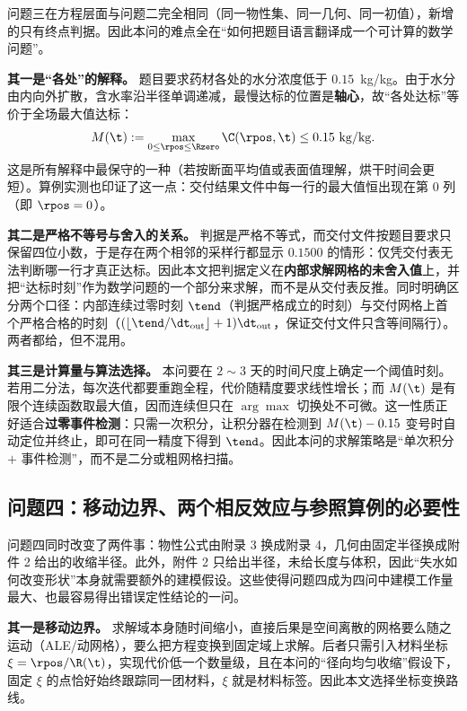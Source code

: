 问题三在方程层面与问题二完全相同（同一物性集、同一几何、同一初值），新增的只有终点判据。因此本问的难点全在``如何把题目语言翻译成一个可计算的数学问题''。

\textbf{其一是``各处''的解释。} 题目要求药材各处的水分浓度低于 $0.15$~kg/kg。由于水分由内向外扩散，含水率沿半径单调递减，最慢达标的位置是\textbf{轴心}，故``各处达标''等价于全场最大值达标：
\begin{equation}
M(\t):=\max_{0\le\rpos\le\Rzero}\C(\rpos,\t)\le 0.15~\mathrm{kg/kg}.
\label{eq:maxcrit}
\end{equation}
这是所有解释中最保守的一种（若按断面平均值或表面值理解，烘干时间会更短）。算例实测也印证了这一点：交付结果文件中每一行的最大值恒出现在第 0 列（即 $\rpos=0$）。

\textbf{其二是严格不等号与舍入的关系。} 判据是严格不等式，而交付文件按题目要求只保留四位小数，于是存在两个相邻的采样行都显示 $0.1500$ 的情形：仅凭交付表无法判断哪一行才真正达标。因此本文把判据定义在\textbf{内部求解网格的未舍入值}上，并把``达标时刻''作为数学问题的一个部分来求解，而不是从交付表反推。同时明确区分两个口径：内部连续过零时刻 $\tend$（判据严格成立的时刻）与交付网格上首个严格合格的时刻（$(\lfloor\tend/\dt_{\mathrm{out}}\rfloor+1)\dt_{\mathrm{out}}$，保证交付文件只含等间隔行）。两者都给，但不混用。

\textbf{其三是计算量与算法选择。} 本问要在 $2\sim3$ 天的时间尺度上确定一个阈值时刻。若用二分法，每次迭代都要重跑全程，代价随精度要求线性增长；而 $M(\t)$ 是有限个连续函数取最大值，因而连续但只在 $\arg\max$ 切换处不可微。这一性质正好适合\textbf{过零事件检测}：只需一次积分，让积分器在检测到 $M(\t)-0.15$ 变号时自动定位并终止，即可在同一精度下得到 $\tend$。因此本问的求解策略是``单次积分 $+$ 事件检测''，而不是二分或粗网格扫描。

\subsection{问题四：移动边界、两个相反效应与参照算例的必要性}

问题四同时改变了两件事：物性公式由附录 3 换成附录 4，几何由固定半径换成附件 2 给出的收缩半径。此外，附件 2 只给出半径，未给长度与体积，因此``失水如何改变形状''本身就需要额外的建模假设。这些使得问题四成为四问中建模工作量最大、也最容易得出错误定性结论的一问。

\textbf{其一是移动边界。} 求解域本身随时间缩小，直接后果是空间离散的网格要么随之运动（ALE/动网格），要么把方程变换到固定域上求解。后者只需引入材料坐标 $\xi=\rpos/\R(\t)$，实现代价低一个数量级，且在本问的``径向均匀收缩''假设下，固定 $\xi$ 的点恰好始终跟踪同一团材料，$\xi$ 就是材料标签。因此本文选择坐标变换路线。

